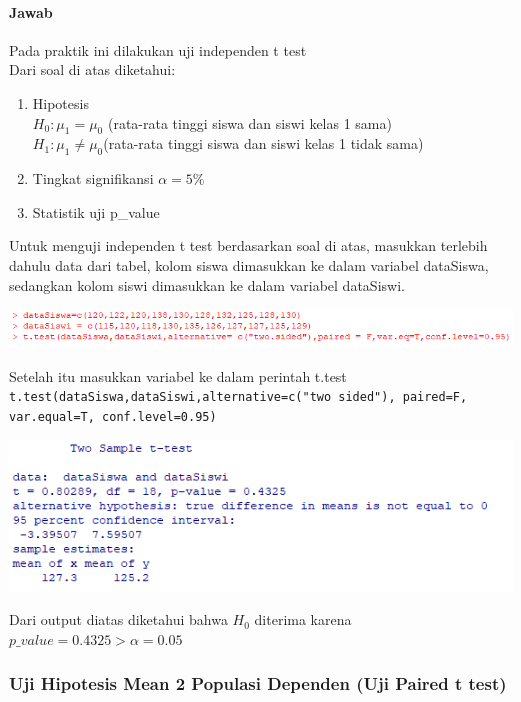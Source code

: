 \documentclass[a4paper,12pt]{article}
\begin{document}
\paragraph{Jawab\\}
Pada praktik ini dilakukan uji independen t test\\
Dari soal di atas diketahui:
\begin{enumerate}[label = \alph*.]
    \item Hipotesis \\
        $H_{0} : \mu_{1} = \mu_{0}$ (rata-rata tinggi siswa dan siswi kelas 1 sama)\\
        $H_{1} : \mu_{1} \neq \mu_{0}$(rata-rata tinggi siswa dan siswi kelas 1 tidak sama)
    \item Tingkat signifikansi $\alpha = 5\%$
    \item Statistik uji p\_value
\end{enumerate}
Untuk menguji independen t test berdasarkan soal di atas, masukkan terlebih dahulu data dari tabel, kolom siswa dimasukkan ke dalam variabel dataSiswa, sedangkan kolom siswi dimasukkan ke 
dalam variabel dataSiswi.\\
\begin{center}
    \includegraphics[width = \linewidth]{img1.png}
\end{center}
Setelah itu masukkan variabel ke dalam perintah t.test\\
\texttt{t.test(dataSiswa,dataSiswi,alternative=c("two sided"), paired=F, var.equal=T, conf.level=0.95)}
\begin{center}
    \includegraphics[width = \linewidth]{img2.png}
\end{center}
Dari output diatas diketahui bahwa $H_{0}$ diterima karena $p\_value = 0.4325 > \alpha = 0.05$

\subsubsection{Uji Hipotesis Mean 2 Populasi Dependen (Uji Paired t test)}
\end{document}
